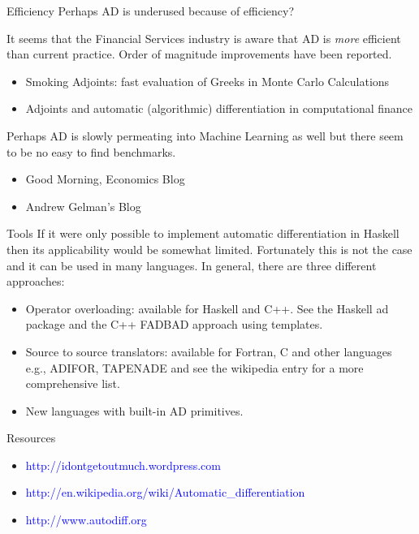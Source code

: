 \documentclass{beamer}
\begin{document}
\begin{frame}[fragile]{Efficiency}
Perhaps AD is underused because of efficiency?

It seems that the Financial Services industry is aware that AD is {\em
  more} efficient than current practice. Order of magnitude
improvements have been reported.
\begin{itemize}
\item
Smoking Adjoints: fast evaluation of Greeks in Monte Carlo Calculations
\item
Adjoints and automatic (algorithmic) differentiation in computational finance
\end{itemize}

Perhaps AD is slowly permeating into Machine Learning as well but
there seem to be no easy to find benchmarks.

\begin{itemize}
\item
Good Morning, Economics Blog
\item
Andrew Gelman's Blog
\end{itemize}
\end{frame}

\begin{frame}[fragile]{Tools}
  If it were only possible to implement automatic differentiation in
  Haskell then its applicability would be somewhat
  limited. Fortunately this is not the case and it can be used in many
  languages. In general, there are three different approaches:

\begin{itemize}
\item Operator overloading: available for Haskell and C++. See the
  Haskell ad package and the C++ FADBAD approach using templates.
\item Source to source translators: available for Fortran, C and other
  languages e.g., ADIFOR, TAPENADE and see the wikipedia entry for a
  more comprehensive list.
\item New languages with built-in AD primitives.
\end{itemize}
\end{frame}

\begin{frame}[fragile]{Resources}
\begin{itemize}
\item \textcolor{blue}{http://idontgetoutmuch.wordpress.com}
\item
  \textcolor{blue}{http://en.wikipedia.org/wiki/Automatic\_differentiation}
\item \textcolor{blue}{http://www.autodiff.org}
\end{itemize}
\end{frame}
\end{document}
